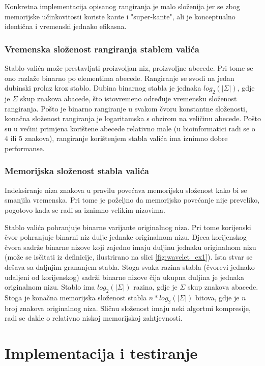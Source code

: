 \documentclass[times, utf8, seminar, numeric]{fer}
\begin{document}
Konkretna implementacija opisanog rangiranja je malo složenija jer se zbog
memorijske učinkovitosti koriste kante i "super-kante", ali je konceptualno
identična i vremenski jednako efikasna.

\subsection{Vremenska složenost rangiranja stablem valića}

Stablo valića može prestavljati proizvoljan niz, proizvoljne abecede. Pri tome
se ono razlaže binarno po elementima abecede. Rangiranje se svodi na jedan
dubinski prolaz kroz stablo. Dubina binarnog stabla je jednaka
$log_2(|\Sigma|)$, gdje je $\Sigma$ skup znakova abacede,
što istovremeno određuje vremensku složenost rangiranja. Pošto je
binarno rangiranje u svakom čvoru konstantne složenosti, konačna složenost
rangiranja je logaritamska s obzirom na veličinu abecede. Pošto su
u većini primjena korištene abecede relativno male (u bioinformatici radi
se o 4 ili 5 znakova), rangiranje korištenjem stabla valića ima iznimno
dobre performanse.

\subsection{Memorijska složenost stabla valića}

Indeksiranje niza znakova u pravilu povećava memorijsku složenost kako
bi se smanjila vremenska. Pri tome je poželjno da memorijsko povećanje
nije preveliko, pogotovo kada se radi sa iznimno velikim nizovima.

Stablo valića pohranjuje binarne varijante originalnog niza. Pri tome
korijenski čvor pohranjuje binarni niz dulje jednake originalnom nizu.
Djeca korijenskog čvora sadrže binarne nizove koji zajedno imaju duljinu
jednaku originalnom nizu (može se isčitati iz definicije, ilustrirano
na slici \ref{fig:wavelet_ex1}). Ista stvar se dešava sa daljnjim grananjem
stabla. Stoga svaka razina stabla (čvorevi jednako udaljeni od korijenskog)
sadrži binarne nizove čija ukupna duljina je jednaka originalnom nizu.
Stablo ima  $log_2(|\Sigma|)$ razina, gdje je $\Sigma$ skup znakova abacede.
Stoga je konačna memorijska složenost stabla $n * log_2(|\Sigma|)$ bitova, gdje
je $n$ broj znakova originalnog niza.
Sličnu složenost imaju neki algortmi kompresije, radi se dakle o
relativno niskoj memorijskoj zahtjevnosti.

\chapter{Implementacija i testiranje}
\end{document}
